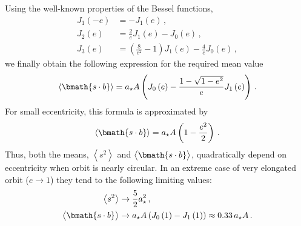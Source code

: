\documentclass[fleqn,usenatbib,useAMS,usedcolumn]{mnras}
\begin{document}
Using the well-known properties of the Bessel functions,
\begin{align}
  J_1\left(-e\right) &= -J_1\left(e\right)\,, \\
  J_2\left(e\right) &= \frac{2}{e}J_1\left(e\right)-J_0\left(e\right)\,, \\
  J_3\left(e\right) &= \left(\frac{8}{e^2}-1\right)J_1\left(e\right)-\frac{4}{e}J_0\left(e\right)\,,
\end{align}
we finally obtain the following expression for the required mean value
\begin{equation}\label{eq:app-ell-sb}
  \left\langle\bmath{s\cdot b}\right\rangle=a_\star A\left(J_0\left(e\right)-\frac{1-\sqrt{1-e^2}}{e}J_1\left(e\right)\right)\,.
\end{equation}
For small eccentricity, this formula is approximated by
\begin{equation}\label{eq:app-ell-sb-approx}
  \left\langle\bmath{s\cdot b}\right\rangle=a_\star A\left(1-\frac{e^2}{2}\right)\,.
\end{equation}
Thus, both the means, $\left\langle s^2\right\rangle$ and $\left\langle\bmath{s\cdot b}\vphantom{s^2}\right\rangle$, quadratically depend on eccentricity when orbit is nearly circular. In an extreme case of very elongated orbit ($e\to 1$) they tend to the following limiting values:
\begin{align}
  \left\langle s^2\right\rangle &\to \frac{5}{2}a_\star^2\,, \\
  \left\langle\bmath{s\cdot b}\vphantom{s^2}\right\rangle &\to a_\star A\left(J_0\left(1\right)-J_1\left(1\right)\right)\approx 0.33\,a_\star A\,.
\end{align}


\bsp	%
\label{lastpage}
\end{document}
